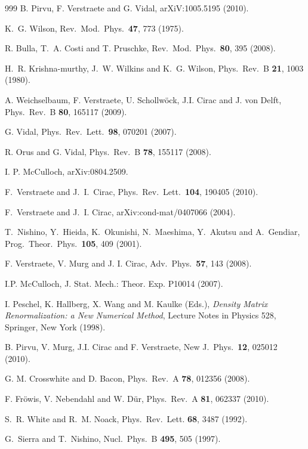 \documentclass[a4paper,10pt,oneside,onecolumn,1p,times]{elsarticle}
\begin{document}
\begin{thebibliography}{999}
 B. Pirvu, F. Verstraete and G. Vidal, arXiV:1005.5195 (2010).

K.~G. Wilson, Rev.\ Mod.\ Phys.\ {\bf 47}, 773 (1975).

R. Bulla, T.~A. Costi and T. Pruschke, Rev.\ Mod.\ Phys.\ {\bf 80}, 395 (2008).

H.~R. Krishna-murthy, J.~W. Wilkins and K.~G. Wilson, Phys.\ Rev.\ B {\bf 21}, 1003 (1980).

A. Weichselbaum, F. Verstraete, U. Schollw\"{o}ck, J.I. Cirac and J. von Delft, Phys.\ Rev.\ B {\bf 80}, 165117 (2009).

G. Vidal, Phys.\ Rev.\ Lett.\ {\bf 98}, 070201 (2007).

R. Orus and G. Vidal, Phys.\ Rev.\ B {\bf 78}, 155117 (2008).

I. P. McCulloch, arXiv:0804.2509.

F.~Verstraete and J.~I.~Cirac, Phys.\ Rev.\ Lett.\ {\bf 104}, 190405 (2010).

F.~Verstraete and J.~I. Cirac, arXiv:cond-mat/0407066 (2004).

T.~Nishino, Y.~Hieida, K.~Okunishi, N.~Maeshima, Y.~Akutsu and A.~Gendiar, Prog.\ Theor.\ Phys.\ {\bf 105}, 409 (2001).

F. Verstraete, V. Murg and J. I. Cirac, Adv.\ Phys.\ {\bf 57}, 143 (2008).

I.P. McCulloch, J. Stat. Mech.: Theor. Exp. P10014 (2007).

I. Peschel, K. Hallberg, X. Wang and M. Kaulke (Eds.), {\em Density Matrix
Renormalization: a New Numerical Method}, Lecture Notes in Physics 528, Springer, New York (1998).

B. Pirvu, V. Murg, J.I. Cirac and F. Verstraete, New J.\ Phys.\ {\bf 12}, 025012 (2010).

G. M. Crosswhite and D. Bacon, Phys.\ Rev.\ A {\bf 78}, 012356 (2008).

F. Fr\"{o}wis, V. Nebendahl and W. D\"{u}r, Phys.\ Rev.\ A {\bf 81}, 062337 (2010).

S.~R. White and R.~M. Noack, Phys.\ Rev.\ Lett. {\bf 68}, 3487 (1992).

 G.~Sierra and T.~Nishino, Nucl.\ Phys.\ B {\bf 495}, 505 (1997).


\end{thebibliography}
\end{document}
